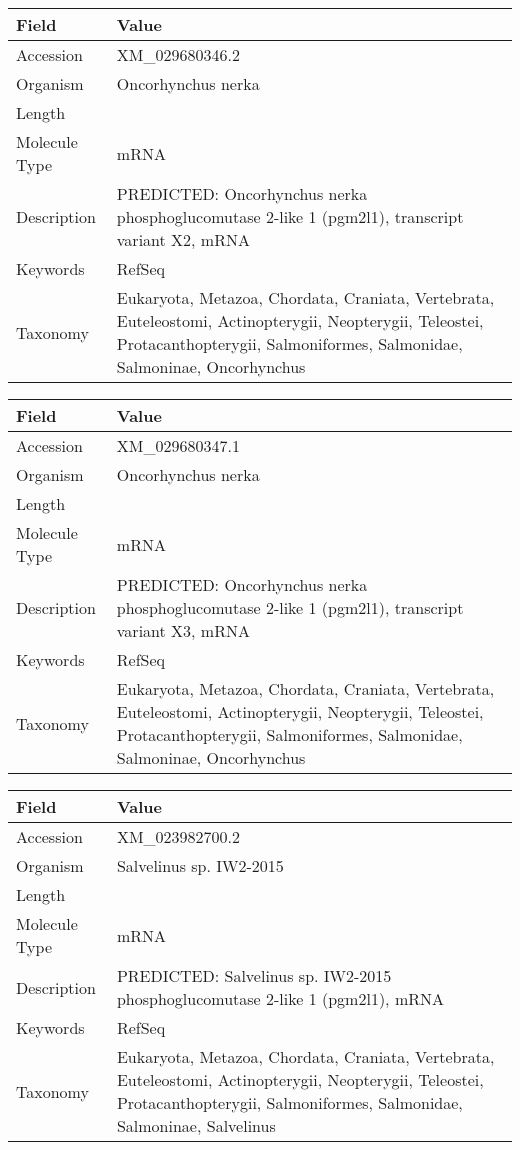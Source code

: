 \documentclass[10pt]{article}
\begin{document}
{\footnotesize
\begin{longtable}{>{\raggedright\arraybackslash}p{4.5cm} >{\raggedright\arraybackslash}p{11.5cm}}
\textbf{Field} & \textbf{Value} \\
\hline
Accession & XM\_029680346.2 \\
Organism & Oncorhynchus nerka \\
Length & 4132 \\
Molecule Type & mRNA \\
Description & PREDICTED: Oncorhynchus nerka phosphoglucomutase 2-like 1 (pgm2l1), transcript variant X2, mRNA \\
Keywords & RefSeq \\
Taxonomy & Eukaryota, Metazoa, Chordata, Craniata, Vertebrata, Euteleostomi, Actinopterygii, Neopterygii, Teleostei, Protacanthopterygii, Salmoniformes, Salmonidae, Salmoninae, Oncorhynchus \\
\end{longtable}
}

{\footnotesize
\begin{longtable}{>{\raggedright\arraybackslash}p{4.5cm} >{\raggedright\arraybackslash}p{11.5cm}}
\textbf{Field} & \textbf{Value} \\
\hline
Accession & XM\_029680347.1 \\
Organism & Oncorhynchus nerka \\
Length & 3953 \\
Molecule Type & mRNA \\
Description & PREDICTED: Oncorhynchus nerka phosphoglucomutase 2-like 1 (pgm2l1), transcript variant X3, mRNA \\
Keywords & RefSeq \\
Taxonomy & Eukaryota, Metazoa, Chordata, Craniata, Vertebrata, Euteleostomi, Actinopterygii, Neopterygii, Teleostei, Protacanthopterygii, Salmoniformes, Salmonidae, Salmoninae, Oncorhynchus \\
\end{longtable}
}

{\footnotesize
\begin{longtable}{>{\raggedright\arraybackslash}p{4.5cm} >{\raggedright\arraybackslash}p{11.5cm}}
\textbf{Field} & \textbf{Value} \\
\hline
Accession & XM\_023982700.2 \\
Organism & Salvelinus sp. IW2-2015 \\
Length & 2602 \\
Molecule Type & mRNA \\
Description & PREDICTED: Salvelinus sp. IW2-2015 phosphoglucomutase 2-like 1 (pgm2l1), mRNA \\
Keywords & RefSeq \\
Taxonomy & Eukaryota, Metazoa, Chordata, Craniata, Vertebrata, Euteleostomi, Actinopterygii, Neopterygii, Teleostei, Protacanthopterygii, Salmoniformes, Salmonidae, Salmoninae, Salvelinus \\
\end{longtable}
}
\end{document}

